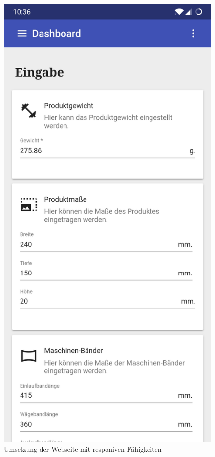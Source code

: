 \begin{figure}[h]
    \centering
    \includegraphics[scale=0.13]{images/kapitel_4/website_smartphone.jpg}
    \caption{Umsetzung der Webseite mit responiven Fähigkeiten}
    \label{fig:umsetzung_website_smartphone}
\end{figure}

